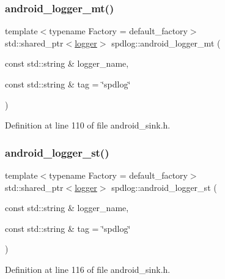 \subsubsection{\texorpdfstring{android\+\_\+logger\+\_\+mt()}{android\_logger\_mt()}}
{\footnotesize\ttfamily template$<$typename Factory  = default\+\_\+factory$>$ \\
std\+::shared\+\_\+ptr$<$\hyperlink{classspdlog_1_1logger}{logger}$>$ spdlog\+::android\+\_\+logger\+\_\+mt (\begin{DoxyParamCaption}\item[{const std\+::string \&}]{logger\+\_\+name,  }\item[{const std\+::string \&}]{tag = {\ttfamily \char`\"{}spdlog\char`\"{}} }\end{DoxyParamCaption})\hspace{0.3cm}{\ttfamily [inline]}}



Definition at line 110 of file android\+\_\+sink.\+h.

\mbox{\label{namespacespdlog_aab5b508d51de238919a570cf3ca6d3db}} 
\subsubsection{\texorpdfstring{android\+\_\+logger\+\_\+st()}{android\_logger\_st()}}
{\footnotesize\ttfamily template$<$typename Factory  = default\+\_\+factory$>$ \\
std\+::shared\+\_\+ptr$<$\hyperlink{classspdlog_1_1logger}{logger}$>$ spdlog\+::android\+\_\+logger\+\_\+st (\begin{DoxyParamCaption}\item[{const std\+::string \&}]{logger\+\_\+name,  }\item[{const std\+::string \&}]{tag = {\ttfamily \char`\"{}spdlog\char`\"{}} }\end{DoxyParamCaption})\hspace{0.3cm}{\ttfamily [inline]}}



Definition at line 116 of file android\+\_\+sink.\+h.

\mbox{\label{namespacespdlog_a33b888a87a0fccc7b7dd5b89413ce6b7}} 
